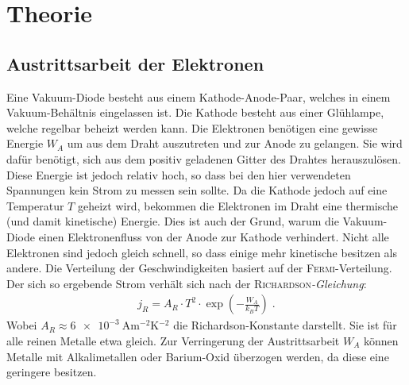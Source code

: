 \documentclass[12pt,a4paper,titlepage,headinclude,bibtotoc]{scrartcl}
\begin{document}
\cite{gerthsen}

\section{Theorie}
\label{sec:theorie}
\subsection{Austrittsarbeit der Elektronen}
Eine Vakuum-Diode besteht aus einem Kathode-Anode-Paar, welches in einem Vakuum-Behältnis eingelassen ist.
Die Kathode besteht aus einer Glühlampe, welche regelbar beheizt werden kann.
Die Elektronen benötigen eine gewisse Energie $W_A$ um aus dem Draht auszutreten und zur Anode zu gelangen.
Sie wird dafür benötigt, sich aus dem positiv geladenen Gitter des Drahtes herauszulösen.
Diese Energie ist jedoch relativ hoch, so dass bei den hier verwendeten Spannungen kein Strom zu messen sein sollte.
Da die Kathode jedoch auf eine Temperatur $T$ geheizt wird, bekommen die Elektronen im Draht eine thermische (und damit kinetische) Energie.
Dies ist auch der Grund, warum die Vakuum-Diode einen Elektronenfluss von der Anode zur Kathode verhindert.
Nicht alle Elektronen sind jedoch gleich schnell, so dass einige mehr kinetische besitzen als andere.
Die Verteilung der Geschwindigkeiten basiert auf der \textsc{Fermi}-Verteilung.
Der sich so ergebende Strom verhält sich nach der \textsc{Richardson}\emph{-Gleichung}:
\begin{align}
	j_R=A_R\cdot T^{2}\cdot \exp\left(-\frac{W_A}{k_BT}\right)\label{eq:richardson}\; .
\end{align}
Wobei $A_R\approx \SI{6e-3}{\ampere\meter^{-2}\kelvin^{-2}}$ die Richardson-Konstante darstellt.
Sie ist für alle reinen Metalle etwa gleich.
Zur Verringerung der Austrittsarbeit $W_A$ können Metalle mit Alkalimetallen oder Barium-Oxid überzogen werden, da diese eine geringere besitzen.


                                                                                                                                                                      
\end{document}

